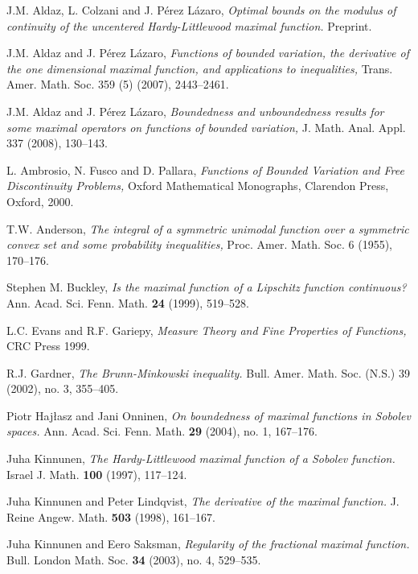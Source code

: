 \documentclass[12pt]{amsart}
\numberwithin{equation}{section}
\theoremstyle{plain}
\theoremstyle{definition}
\theoremstyle{remark}
\begin{document}
\begin{thebibliography}{99}

 J.M. Aldaz, L. Colzani and J. P\'erez L\'azaro,
{\em Optimal bounds on the modulus of continuity
 of the uncentered Hardy-Littlewood maximal function.} Preprint.

 J.M. Aldaz and J. P\'erez L\'azaro, {\em Functions of
bounded variation, the derivative of the one dimensional maximal
function, and applications to inequalities,} Trans. Amer. Math. Soc.
359 (5) (2007), 2443--2461.

 J.M. Aldaz and J. P\'erez L\'azaro, {\em Boundedness and unboundedness results
for some maximal operators on functions of bounded variation,} J.
Math. Anal. Appl. 337 (2008), 130--143.

 L. Ambrosio, N. Fusco and D. Pallara, {\em  Functions of
Bounded Variation and Free Discontinuity Problems,} Oxford
Mathematical Monographs, Clarendon Press, Oxford, 2000.

 T.W. Anderson, {\em The integral of a symmetric unimodal
function over a symmetric convex set and some probability
inequalities,} Proc. Amer. Math. Soc. 6 (1955), 170--176.

 Stephen M. Buckley,
{\em Is the maximal function of a Lipschitz function continuous?}
 Ann. Acad. Sci. Fenn. Math.  {\bf 24} (1999), 519--528.

 L.C. Evans and R.F. Gariepy, {\em  Measure Theory and
Fine Properties of Functions,} CRC Press 1999.

 R.J. Gardner, {\em The Brunn-Minkowski
inequality.}  Bull. Amer. Math. Soc. (N.S.) 39 (2002), no. 3, 355--405.

 Piotr Haj\l asz and Jani Onninen, {\em On
boundedness of maximal functions in Sobolev spaces.}
    Ann. Acad. Sci. Fenn. Math. {\bf 29} (2004), no. 1,
167--176.

  Juha Kinnunen,
{\em The Hardy-Littlewood maximal function of a Sobolev function.}
 Israel J. Math.   {\bf 100} (1997), 117--124.

  Juha Kinnunen and Peter Lindqvist,
{\em The derivative of the maximal function.}
 J. Reine Angew.
    Math.  {\bf 503} (1998), 161--167.

 Juha Kinnunen and Eero Saksman,
{\em Regularity of the fractional maximal function.}
Bull. London
    Math. Soc.  {\bf 34} (2003), no. 4, 529--535.


\end{thebibliography}
\end{document}
